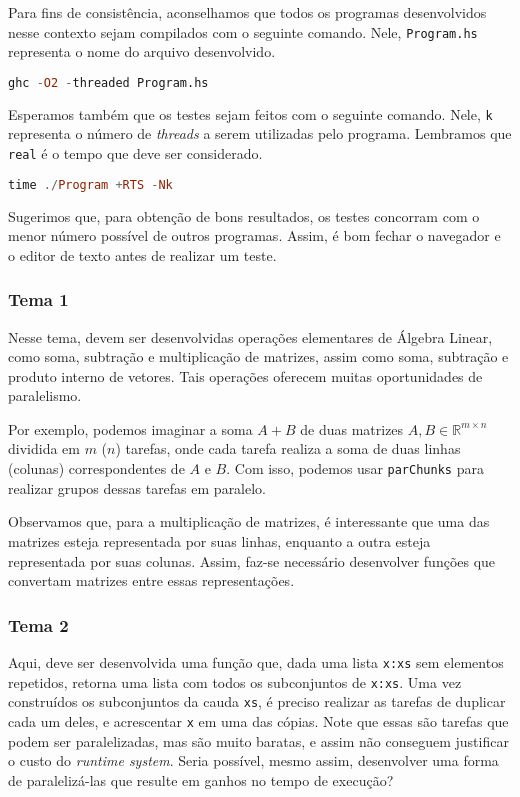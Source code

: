 \documentclass[a4paper]{article}
\begin{document}
Para fins de consistência, aconselhamos que todos os programas desenvolvidos
nesse contexto sejam compilados com o seguinte comando.
Nele, \texttt{Program.hs}
representa o nome do arquivo desenvolvido.

\begin{lstlisting}[language=haskell, frame=single]
ghc -O2 -threaded Program.hs
\end{lstlisting}

Esperamos também que os testes sejam feitos com o seguinte comando. Nele,
\texttt{k} representa o número de \emph{threads} a serem utilizadas pelo programa.
Lembramos que \texttt{real} é o tempo que deve ser considerado.

\begin{lstlisting}[language=haskell, frame=single]
time ./Program +RTS -Nk
\end{lstlisting}

Sugerimos que, para obtenção de bons resultados, os testes concorram com
o menor número possível de outros programas.
Assim, é bom fechar o navegador e o editor de texto antes de realizar um teste.

\subsubsection{Tema 1}

Nesse tema, devem ser desenvolvidas operações elementares de Álgebra Linear,
como soma, subtração e multiplicação de matrizes, assim como soma, subtração e
produto interno de vetores.
Tais operações oferecem muitas oportunidades de paralelismo.

Por exemplo, podemos imaginar a soma $A + B$ de duas matrizes $A, B \in \mathbb{R}^{m
  \times n}$ dividida em $m$ ($n$) tarefas, onde cada tarefa realiza a soma de duas
linhas (colunas) correspondentes de $A$ e $B$.
Com isso, podemos usar \texttt{parChunks} para realizar grupos dessas tarefas em paralelo.

Observamos que, para a multiplicação de matrizes, é interessante que uma das
matrizes esteja representada por suas linhas, enquanto a outra esteja
representada por suas colunas.
Assim, faz-se necessário desenvolver funções que convertam matrizes entre essas representações.

\subsubsection{Tema 2}

Aqui, deve ser desenvolvida uma função que, dada uma lista \texttt{x:xs} sem elementos
repetidos, retorna uma lista com todos os subconjuntos de \texttt{x:xs}.
Uma vez construídos os subconjuntos da cauda \texttt{xs}, é preciso realizar as
tarefas de duplicar cada
um deles, e acrescentar \texttt{x} em uma das cópias.
Note que essas são tarefas que podem ser paralelizadas, mas são muito baratas, e
assim não conseguem
justificar o custo do \emph{runtime system}.
Seria possível, mesmo assim, desenvolver uma forma de paralelizá-las que resulte
em ganhos no tempo de execução?
\end{document}
